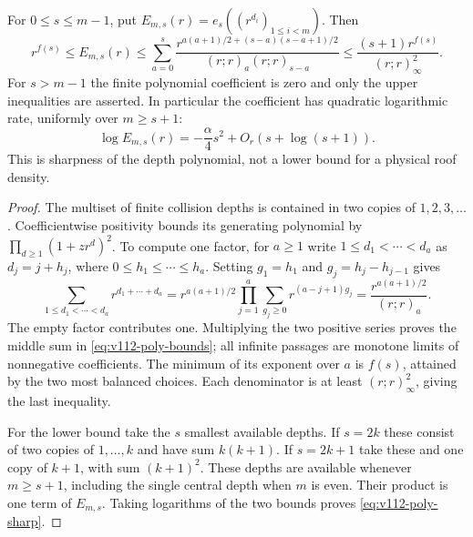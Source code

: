 \begin{lemma}\label{lem:v112-depth-poly}
For $0\le s\le m-1$, put
$E_{m,s}(r)=e_s((r^{d_i})_{1\le i<m})$. Then
\begin{equation}\label{eq:v112-poly-bounds}
 r^{f(s)}\le E_{m,s}(r)
 \le\sum_{a=0}^s
    \frac{r^{a(a+1)/2+(s-a)(s-a+1)/2}}
         {(r;r)_a(r;r)_{s-a}}
 \le\frac{(s+1)r^{f(s)}}{(r;r)_\infty^2}.
\end{equation}
For $s>m-1$ the finite polynomial coefficient is zero and only the
upper inequalities are asserted. In particular the coefficient has
quadratic logarithmic rate, uniformly over $m\ge s+1$:
\begin{equation}\label{eq:v112-poly-sharp}
 \log E_{m,s}(r)=-\frac{\alpha}{4}s^2+O_r(s+\log(s+1)).
\end{equation}
This is sharpness of the depth polynomial, not a lower bound for a
physical roof density.
\end{lemma}
\begin{proof}
The multiset of finite collision depths is contained in two copies
of $1,2,3,\ldots$. Coefficientwise positivity bounds its generating
polynomial by $\prod_{d\ge1}(1+zr^d)^2$.
To compute one factor, for $a\ge1$ write
$1\le d_1<\cdots<d_a$ as $d_j=j+h_j$, where
$0\le h_1\le\cdots\le h_a$. Setting
$g_1=h_1$ and $g_j=h_j-h_{j-1}$ gives
\[
 \sum_{1\le d_1<\cdots<d_a}r^{d_1+\cdots+d_a}
 =r^{a(a+1)/2}
    \prod_{j=1}^a\sum_{g_j\ge0}r^{(a-j+1)g_j}
 =\frac{r^{a(a+1)/2}}{(r;r)_a}.
\]
The empty factor contributes one. Multiplying the two positive
series proves the middle sum in \eqref{eq:v112-poly-bounds}; all
infinite passages are monotone limits of nonnegative coefficients.
The minimum of its exponent over $a$ is $f(s)$, attained by the
two most balanced choices. Each denominator is at least
$(r;r)_\infty^2$, giving the last inequality.

For the lower bound take the $s$ smallest available depths. If
$s=2k$ these consist of two copies of $1,\ldots,k$ and have sum
$k(k+1)$. If $s=2k+1$ take these and one copy of $k+1$, with sum
$(k+1)^2$. These depths are available whenever $m\ge s+1$, including
the single central depth when $m$ is even. Their product is one
term of $E_{m,s}$. Taking logarithms of the two bounds proves
\eqref{eq:v112-poly-sharp}.
\end{proof}

